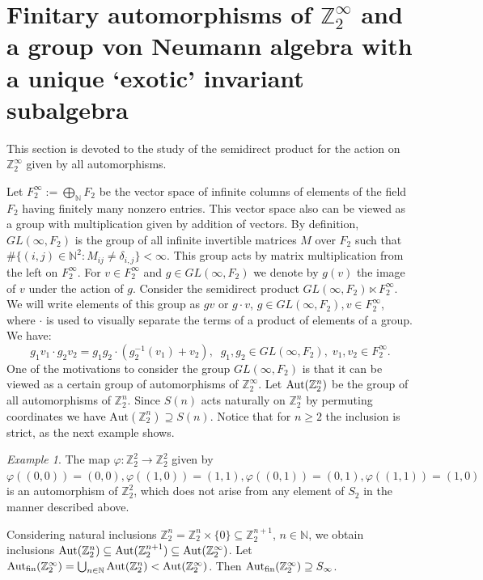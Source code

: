 \documentclass[11pt]{amsart}
\newcommand{\N}{\mathbb N}
\newcommand{\Z}{\mathbb Z}
\newcommand{\aut}{{\rm Aut}}
\newcommand{\fin}{{\rm fin}}
\newcommand{\Aut}{\textup{Aut}}
\theoremstyle{plain}
\theoremstyle{definition}
\theoremstyle{remark}
\newtheorem{example}[theorem]{Example}
\numberwithin{equation}{section}
\begin{document}
\section{Finitary automorphisms of $\mathbb{Z}_2^\infty$ and a group von Neumann algebra with a unique `exotic' invariant subalgebra}
\label{sec:uniqueexotic}

This section is devoted to the study of the semidirect product for the action on $\Z_2^\infty$ given by all  automorphisms.

Let $F_2^\infty:=\bigoplus_{\mathbb{N}} F_2$ be the vector space of infinite columns of elements of the field $F_2$ having finitely many nonzero entries. This vector space also can be viewed as a group with multiplication given by addition of vectors. By definition, $GL(\infty, F_2)$ is the group of all infinite invertible matrices $M$ over $ F_2$  such that $\#\{(i,j)\in \N^2:M_{ij}\neq \delta_{i,j}\}<\infty$. This group acts by matrix multiplication from the left on $F_2^\infty$. 
For $v\in F_2^\infty$ and $g\in GL(\infty, F_2)$ we denote by $g(v)$ the image of $v$ under the action of $g$. Consider the semidirect product $GL(\infty,F_2)\ltimes F_2^\infty$. We will write elements of this group as $gv$ or $g\cdot v$, $g\in GL(\infty,F_2),v\in F_2^\infty$, where $\cdot$ is used to visually separate the terms of a product of elements of a group. We have: \begin{equation}\label{eq: product in H}
	g_1v_1\cdot g_2v_2=g_1g_2\cdot (g_2^{-1}(v_1)+v_2),\;\;g_1,g_2\in GL(\infty,F_2),\;v_1,v_2\in F_2^\infty.
\end{equation}
 One of the motivations to consider the group $GL(\infty,F_2)$ is that it can be viewed as a certain group of automorphisms of $\mathbb Z_2^\infty$. Let $\Aut(\mathbb Z_2^n)$ be the group of all automorphisms of $\mathbb Z_2^n$. Since $S(n)$ acts naturally on $\mathbb Z_2^n$ by permuting coordinates we have $\mathrm{Aut}(\mathbb Z_2^n)\supseteq S(n)$. Notice that for $n\geqslant 2$ the inclusion is strict, as the next example shows.
\begin{example} The map $\varphi:\mathbb Z_2^2\to\mathbb Z_2^2$ given by $\varphi((0,0))=(0,0),\varphi((1,0))=(1,1),\varphi((0,1))=(0,1),\varphi((1,1))=(1,0)$ is an automorphism of $\mathbb Z_2^2$, which does not arise from any element of $S_2$ in the manner described above.
\end{example}

Considering natural inclusions $\mathbb Z_2^n=\mathbb Z_2^n\times \{0\}\subseteq \mathbb Z_2^{n+1}$, $n \in \N$, we obtain inclusions $\Aut(\mathbb Z_2^n)\subseteq\aut(\mathbb Z_2^{n+1})\subseteq\Aut (\Z_2^\infty)$. Let $\Aut_\fin (\Z_2^\infty)=\bigcup_{n\in\mathbb N}\aut(\mathbb Z_2^n)<\aut (\Z_2^\infty)$. Then $\Aut_\fin (\Z_2^\infty)\supseteq S_\infty$.
\end{document}
